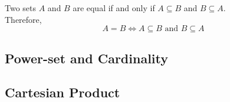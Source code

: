 

\begin{definition}
    Two sets \(A\) and \(B\) are equal if and only if \(A \subseteq B\) and \(B \subseteq A\).\\
    Therefore, \[A = B \iff A \subseteq B \text{ and } B \subseteq A\]
\end{definition}

\subsection{Power-set and Cardinality}


\subsection{Cartesian Product}
\label{sec: ctp}


